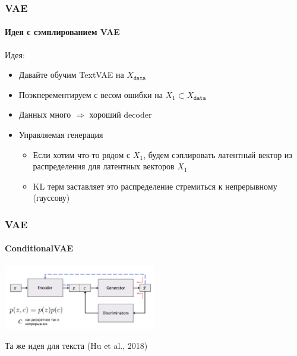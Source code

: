 \documentclass[10pt]{beamer}
\newcommand{\X}[1]{X_{\texttt{#1}}}
\newcommand{\Xdata}{\X{data}}
\begin{document}
\begin{frame}
\frametitle{VAE}
\framesubtitle{Идея с сэмплированием VAE}

Идея:
\begin{itemize}
    \item Давайте обучим TextVAE на $\Xdata$
    \item Поэкперементируем с весом ошибки на $X_1 \subset \Xdata$
    \item Данных много $\Rightarrow$ хороший decoder
    \item Управляемая генерация
    \begin{itemize}
        \item Если хотим что-то рядом с $X_1$, будем сэплировать латентный вектор из распределения для латентных векторов $X_1$
        \item KL терм заставляет это распределение стремиться к непрерывному (гауссову)
    \end{itemize}
\end{itemize}

\end{frame}
\begin{frame}
\frametitle{VAE}
\framesubtitle{ConditionalVAE}

\begin{center}
    \includegraphics[width=0.5\textwidth]{images/cvae.png}
\end{center}

Та же идея для текста (Hu et al., 2018)

\end{frame}
\end{document}
